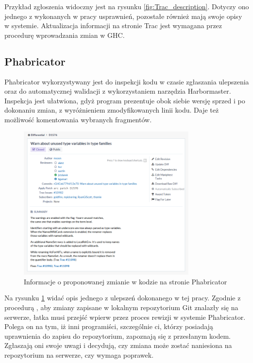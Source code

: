 Przykład zgłoszenia widoczny jest na rysunku \ref{fig:Trac_description}. Dotyczy
ono jednego z wykonanych w pracy usprawnień, pozostałe również mają swoje opisy
w systemie. Aktualizacja informacji na stronie Trac jest wymagana przez
procedurę wprowadzania zmian w GHC\cite{WikiFixingBugs}.

\subsection{Phabricator}

\cite{WikiPhabricator}

Phabricator wykorzystywany jest do inspekcji kodu w czasie zgłaszania ulepszenia
oraz do automatycznej walidacji z wykorzystaniem narzędzia
Harbormaster. Inspekcja jest ułatwiona, gdyż program prezentuje obok siebie
wersję sprzed i po dokonaniu zmian, z wyróżnieniem zmodyfikowanych linii
kodu. Daje też możliwość komentowania wybranych fragmentów.

\begin{figure}[ht]
    \centering
    \includegraphics[width=0.8\textwidth]{images/Phabricator_summary}
    \caption{Informacje o proponowanej zmianie w kodzie na stronie Phabricator}
    \label{fig:Phabricator_summary}
\end{figure}

Na rysunku \ref{fig:Phabricator_summary} widać opis jednego z ulepszeń
dokonanego w tej pracy. Zgodnie z procedurą \cite{WikiFixingBugs}, aby zmiany
zapisane w lokalnym repozytorium Git znalazły się na serwerze, łatka musi
przejść wpierw przez proces rewizji w systemie Phabricator. Polega on na tym, iż
inni programiści, szczególnie ci, którzy posiadają uprawnienia do zapisu do
repozytorium, zapoznają się z przesłanym kodem. Zgłaszają oni swoje uwagi i
decydują, czy zmiana może zostać naniesiona na repozytorium na serwerze, czy
wymaga poprawek.


